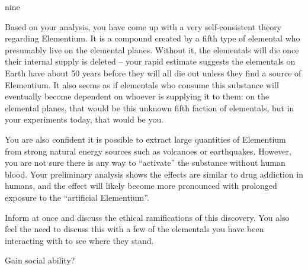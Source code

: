 \documentclass[notebook]{elementals}
\begin{document}
\begin{page}{nine}

Based on your analysis, you have come up with a very self-consistent theory regarding Elementium. It is a compound created by a fifth type of elemental who presumably live on the elemental planes. Without it, the elementals will die once their internal supply is deleted -- your rapid estimate suggests the elementals on Earth have about 50 years before they will all die out unless they find a source of Elementium. It also seems as if elementals who consume this substance will eventually become dependent on whoever is supplying it to them: on the elemental planes, that would be this unknown fifth faction of elementals, but in your experiments today, that would be you.

You are also confident it is possible to extract large quantities of Elementium from strong natural energy sources such as volcanoes or earthquakes. However, you are not sure there is any way to ``activate'' the substance without human blood. Your preliminary analysis shows the effects are similar to drug addiction in humans, and the effect will likely become more pronounced with prolonged exposure to the ``artificial Elementium''.

Inform \cDiplomat{} at once and discuss the ethical ramifications of this discovery. You also feel the need to discuss this with a few of the elementals you have been interacting with to see where they stand.

Gain social ability?

\end{page}

\endnotebook
\end{document}
